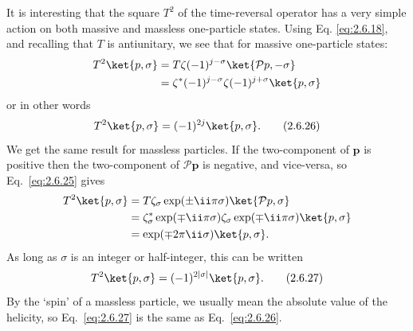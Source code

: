 It is interesting that the square $T^2$ of the time-reversal operator has a
very simple action on both massive and massless one-particle states. Using Eq.
\eqref{eq:2.6.18}, and recalling that $T$ is antiunitary, we see that for massive
one-particle states:
\[
\begin{aligned}
T^2\ket{p,\sigma}
&=T\zeta(-1)^{j-\sigma}\ket{\mathcal{P}p,-\sigma}\\
&=\zeta^*(-1)^{j-\sigma}\zeta(-1)^{j+\sigma}\ket{p,\sigma}
\end{aligned}
\]
or in other words
\begin{equation}
T^2\ket{p,\sigma}=(-1)^{2j}\ket{p,\sigma}.
\tag{2.6.26}\label{eq:2.6.26}
\end{equation}
We get the same result for massless particles. If the two-component of
$\mathbf{p}$ is positive then the two-component of $\mathcal{P}\mathbf{p}$ is
negative, and vice-versa, so Eq.~\eqref{eq:2.6.25} gives
\[
\begin{aligned}
T^2\ket{p,\sigma}
&=T\zeta_\sigma\exp(\pm \ii\pi\sigma)
  \ket{\mathcal{P}p,\sigma}\\
&=\zeta_\sigma^*\exp(\mp \ii\pi\sigma)
  \zeta_\sigma\exp(\mp \ii\pi\sigma)\ket{p,\sigma}\\
&=\exp(\mp2\pi \ii\sigma)\ket{p,\sigma}.
\end{aligned}
\]
As long as $\sigma$ is an integer or half-integer, this can be written
\begin{equation}
T^2\ket{p,\sigma}=(-1)^{2|\sigma|}\ket{p,\sigma}.
\tag{2.6.27}\label{eq:2.6.27}
\end{equation}
By the `spin' of a massless particle, we usually mean the absolute value of
the helicity, so Eq.~\eqref{eq:2.6.27} is the same as Eq.~\eqref{eq:2.6.26}.

